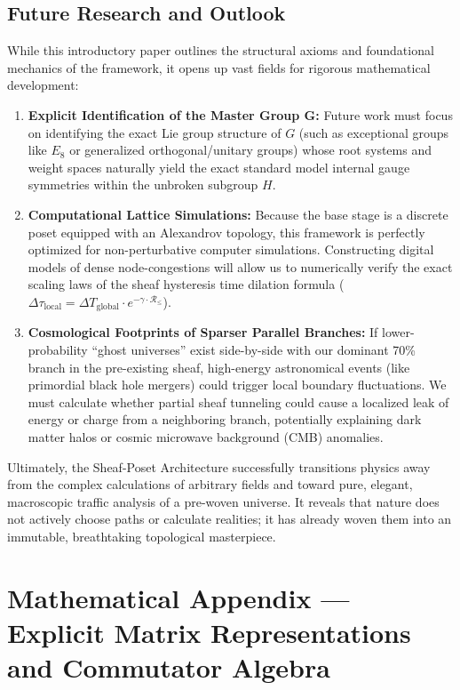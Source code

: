 \documentclass[12pt,letterpaper]{article}
\begin{document}
\subsection{Future Research and Outlook}
While this introductory paper outlines the structural axioms and foundational mechanics of the framework, it opens up vast fields for rigorous mathematical development:
\begin{enumerate}
    \item \textbf{Explicit Identification of the Master Group G:} Future work must focus on identifying the exact Lie group structure of $G$ (such as exceptional groups like $E_8$ or generalized orthogonal/unitary groups) whose root systems and weight spaces naturally yield the exact standard model internal gauge symmetries within the unbroken subgroup $H$.
    \item \textbf{Computational Lattice Simulations:} Because the base stage is a discrete poset equipped with an Alexandrov topology, this framework is perfectly optimized for non-perturbative computer simulations. Constructing digital models of dense node-congestions will allow us to numerically verify the exact scaling laws of the sheaf hysteresis time dilation formula ($\Delta \tau_{\text{local}} = \Delta T_{\text{global}} \cdot e^{-\gamma \cdot \mathcal{R}_{\le}}$).
    \item \textbf{Cosmological Footprints of Sparser Parallel Branches:} If lower-probability ``ghost universes'' exist side-by-side with our dominant 70\% branch in the pre-existing sheaf, high-energy astronomical events (like primordial black hole mergers) could trigger local boundary fluctuations. We must calculate whether partial sheaf tunneling could cause a localized leak of energy or charge from a neighboring branch, potentially explaining dark matter halos or cosmic microwave background (CMB) anomalies.
\end{enumerate}

Ultimately, the Sheaf-Poset Architecture successfully transitions physics away from the complex calculations of arbitrary fields and toward pure, elegant, macroscopic traffic analysis of a pre-woven universe. It reveals that nature does not actively choose paths or calculate realities; it has already woven them into an immutable, breathtaking topological masterpiece.

\section{Mathematical Appendix --- Explicit Matrix Representations and Commutator Algebra}
\end{document}
